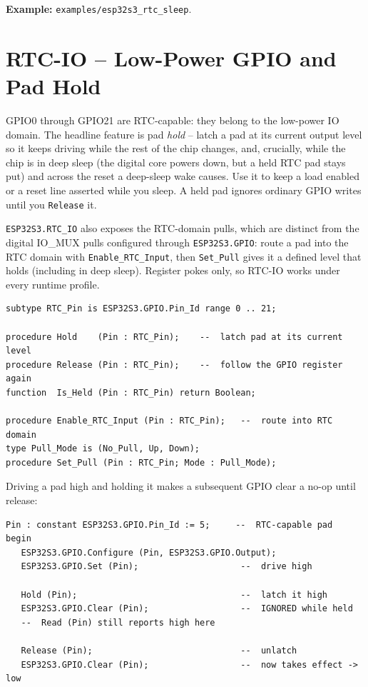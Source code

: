 \noindent\textbf{Example:} \texttt{examples/esp32s3\_rtc\_sleep}.

\section{RTC-IO -- Low-Power GPIO and Pad Hold}
\label{app:int:rtcio}

GPIO0 through GPIO21 are RTC-capable: they belong to the low-power IO domain. The
headline feature is pad \emph{hold} -- latch a pad at its current output level so
it keeps driving while the rest of the chip changes, and, crucially, while the
chip is in deep sleep (the digital core powers down, but a held RTC pad stays put)
and across the reset a deep-sleep wake causes. Use it to keep a load enabled or a
reset line asserted while you sleep. A held pad ignores ordinary GPIO writes until
you \texttt{Release} it.

\texttt{ESP32S3.RTC\_IO} also exposes the RTC-domain pulls, which are distinct
from the digital IO\_MUX pulls configured through \texttt{ESP32S3.GPIO}: route a
pad into the RTC domain with \texttt{Enable\_RTC\_Input}, then \texttt{Set\_Pull}
gives it a defined level that holds (including in deep sleep). Register pokes only,
so RTC-IO works under every runtime profile.

\begin{lstlisting}
subtype RTC_Pin is ESP32S3.GPIO.Pin_Id range 0 .. 21;

procedure Hold    (Pin : RTC_Pin);    --  latch pad at its current level
procedure Release (Pin : RTC_Pin);    --  follow the GPIO register again
function  Is_Held (Pin : RTC_Pin) return Boolean;

procedure Enable_RTC_Input (Pin : RTC_Pin);   --  route into RTC domain
type Pull_Mode is (No_Pull, Up, Down);
procedure Set_Pull (Pin : RTC_Pin; Mode : Pull_Mode);
\end{lstlisting}

Driving a pad high and holding it makes a subsequent GPIO clear a no-op until
release:

\begin{lstlisting}
Pin : constant ESP32S3.GPIO.Pin_Id := 5;     --  RTC-capable pad
begin
   ESP32S3.GPIO.Configure (Pin, ESP32S3.GPIO.Output);
   ESP32S3.GPIO.Set (Pin);                    --  drive high

   Hold (Pin);                                --  latch it high
   ESP32S3.GPIO.Clear (Pin);                  --  IGNORED while held
   --  Read (Pin) still reports high here

   Release (Pin);                             --  unlatch
   ESP32S3.GPIO.Clear (Pin);                  --  now takes effect -> low
\end{lstlisting}

